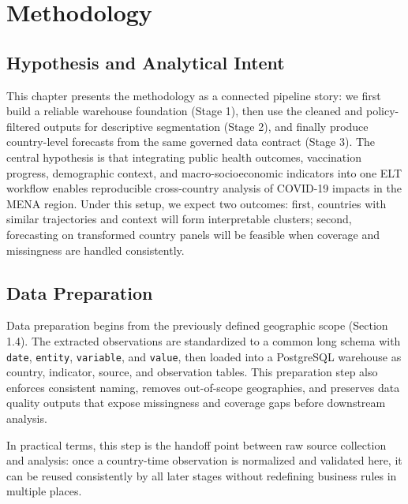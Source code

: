 \documentclass[a4paper]{report}
\begin{document}
\chapter{Methodology}\label{ch4:methodology}
\section{Hypothesis and Analytical Intent}
This chapter presents the methodology as a connected pipeline story: we first build a reliable warehouse foundation (Stage 1), then use the cleaned and policy-filtered outputs for descriptive segmentation (Stage 2), and finally produce country-level forecasts from the same governed data contract (Stage 3).
The central hypothesis is that integrating public health outcomes, vaccination progress, demographic context, and macro-socioeconomic indicators into one ELT workflow enables reproducible cross-country analysis of COVID-19 impacts in the MENA region.
Under this setup, we expect two outcomes: first, countries with similar trajectories and context will form interpretable clusters; second, forecasting on transformed country panels will be feasible when coverage and missingness are handled consistently.

\section{Data Preparation}
Data preparation begins from the previously defined geographic scope (Section 1.4).
The extracted observations are standardized to a common long schema with \texttt{date}, \texttt{entity}, \texttt{variable}, and \texttt{value}, then loaded into a PostgreSQL warehouse as country, indicator, source, and observation tables.
This preparation step also enforces consistent naming, removes out-of-scope geographies, and preserves data quality outputs that expose missingness and coverage gaps before downstream analysis.

In practical terms, this step is the handoff point between raw source collection and analysis: once a country-time observation is normalized and validated here, it can be reused consistently by all later stages without redefining business rules in multiple places.
\end{document}
